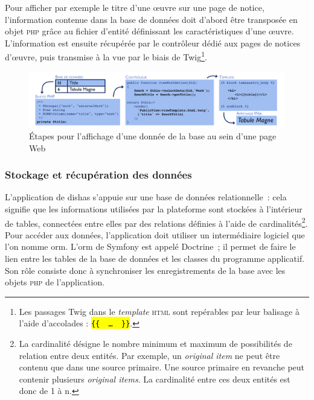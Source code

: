 \documentclass[a4paper,12pt,twoside]{book}
\let\OldTexttt\texttt
\renewcommand{\texttt}[1]{\OldTexttt{\hl{#1}}}
\newcommand{\eng}{\emph}
\newcommand{\oi}{\eng{original item}\xspace}
\newcommand{\ois}{\eng{original items}\xspace}
\newcommand{\bdd}{base de données\xspace}
\newcommand{\html}{\textsc{html}\xspace}
\newcommand{\php}{\textsc{php}\xspace}
\newcommand{\dishas}{\gls{dishas}\xspace}
\newcommand{\orm}{\gls{orm}\xspace}
\begin{document}
Pour afficher par exemple le titre d'une œuvre sur une page de notice, l'information contenue dans la \bdd doit d'abord être transposée en objet \php grâce au fichier d'entité définissant les caractéristiques d'une œuvre. L'information est ensuite récupérée par le contrôleur dédié aux pages de notices d'œuvre, puis transmise à la vue par le biais de Twig\footnote{Les passages Twig dans le \eng{template} \html sont repérables par leur balisage à l'aide d'accolades : \texttt{\{\{~~\dots~~\}\}}.}.

\begin{figure}[h!]
	\centering
	\includegraphics[width=16cm]{Images/Fonctionnement-mvc.png}
	\caption{Étapes pour l'affichage d'une donnée de la base au sein d'une page Web}
\end{figure}


			\subsubsection{Stockage et récupération des données}
L'application de \dishas s'appuie sur une \bdd relationnelle~: cela signifie que les informations utilisées par la plateforme sont stockées à l'intérieur de tables, connectées entre elles par des relations définies à l'aide de cardinalités\footnote{La cardinalité désigne le nombre minimum et maximum de possibilités de relation entre deux entités. Par exemple, un \oi ne peut être contenu que dans une source primaire. Une source primaire en revanche peut contenir plusieurs \ois. La cardinalité entre ces deux entités est donc de 1 à n.}. Pour accéder aux données, l'application doit utiliser un intermédiaire logiciel que l'on nomme \orm. L'\orm de Symfony est appelé Doctrine~; il permet de faire le lien entre les tables de la \bdd et les classes du programme applicatif. Son rôle consiste donc à synchroniser les enregistrements de la base avec les objets \php de l'application.
\end{document}
